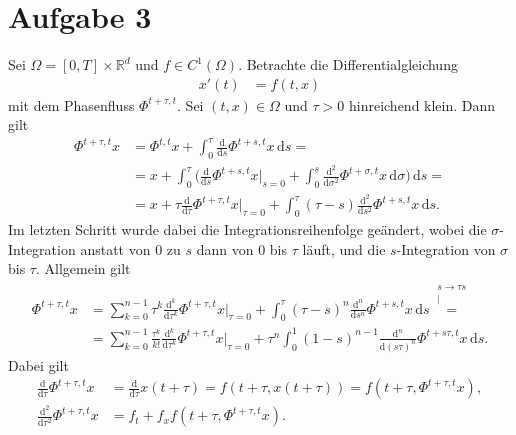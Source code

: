 \documentclass[english, parskip=full]{scrartcl}
\newcommand{\kom}{}
\newcommand{\intx}{}
\newcommand{\kla}{}
\newcommand{\tecxt}{}
\begin{document}
\section*{Aufgabe 3}
Sei $\Omega = [0,T] \times \mathbb{R}^d$ und $f\in C^1(\Omega)$.
Betrachte die Differentialgleichung
\begin{align}
x'(t) &= f(t,x)
\end{align}
mit dem Phasenfluss $\Phi^{t+\tau,t}$.
Sei $(t,x)\in\Omega$ und $\tau > 0$ hinreichend klein.
Dann gilt
\begin{align}
\Phi^{t+\tau,t}x &= \Phi^{t,t}x + \intx\int_{0}^{\tau} \frac{\tecxt\text{d}}{\tecxt\text{d}s} \Phi^{t+s,t}x\, \mathrm{d}s = \\
&= x + \intx\int_{0}^{\tau} \bigg( \frac{\tecxt\text{d}}{\tecxt\text{d}s} \Phi^{t+s,t}x \bigg\vert_{s=0} + \intx\int_{0}^{s}  \frac{\tecxt\text{d}^2}{\tecxt\text{d}\sigma^2} \Phi^{t+\sigma,t}x \, \mathrm{d}\sigma \bigg) \, \mathrm{d}s = \\
&= x + \tau \frac{\tecxt\text{d}}{\tecxt\text{d}\tau} \Phi^{t+\tau,t} x\bigg\vert_{\tau = 0} + \intx\int_{0}^{\tau} (\tau - s) \frac{\tecxt\text{d}^2}{\tecxt\text{d}s^2} \Phi^{t+s,t}x \, \mathrm{d}s.
\end{align}
Im letzten Schritt wurde dabei die Integrationsreihenfolge geändert, wobei die $\sigma$-Integration anstatt von $0$ zu $s$ dann von $0$ bis $\tau$ läuft, und die $s$-Integration von $\sigma$ bis $\tau$.
Allgemein gilt
\begin{align}
\Phi^{t+\tau,t} x &= \sum_{k=0}^{n-1} \tau^k \frac{\tecxt\text{d}^k}{\tecxt\text{d}\tau^k} \Phi^{t+\tau,t} x \bigg\vert_{\tau=0} + \intx\int_{0}^{\tau} (\tau - s)^n \frac{\tecxt\text{d}^n}{\tecxt\text{d}s^n} \Phi^{t+s,t}x \, \mathrm{d}s \kom\overset{\substack{{s \rightarrow \tau s} \\ |}}{=} \\
&= \sum_{k=0}^{n-1} \frac{\tau^k}{k!} \frac{\tecxt\text{d}^k}{\tecxt\text{d}\tau^k} \Phi^{t+\tau,t} x \bigg\vert_{\tau=0} + \tau^{n} \intx\int_{0}^{1} (1 - s)^{n-1} \frac{\tecxt\text{d}^n}{\tecxt\text{d}(s\tau)^n} \Phi^{t+s\tau,t}x \, \mathrm{d}s.
\end{align}
Dabei gilt
\begin{align}
\frac{\tecxt\text{d}}{\tecxt\text{d}\tau} \Phi^{t+\tau,t} x &= \frac{\tecxt\text{d}}{\tecxt\text{d}\tau} x(t+\tau) = f(t+\tau, x(t+\tau)) = f\kla\left( t + \tau, \Phi^{t+\tau,t}x \right),\\
\frac{\tecxt\text{d}^2}{\tecxt\text{d}\tau^2} \Phi^{t+\tau,t} x &= f_t + f_x f\kla\left( t+\tau, \Phi^{t+\tau,t}x \right).
\end{align}
\end{document}
